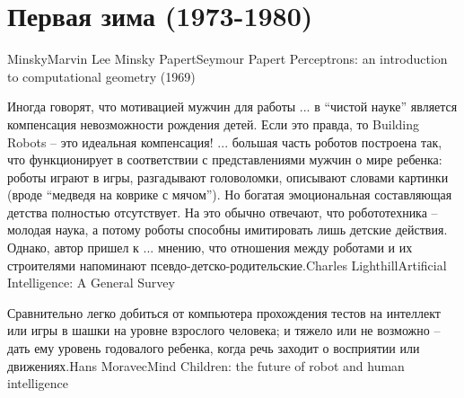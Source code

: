 \documentclass[24pt,pdf,hyperref={unicode}]{beamer}
\begin{document}
\section{Первая зима (1973-1980)}

\begin{frame}


\doublebio
{Minsky}{Marvin Lee Minsky}
{Papert}{Seymour Papert}
{Perceptrons: an introduction to computational geometry (1969)}

\end{frame}


\begin{frame}
\end{frame}

\begin{frame}
\citate
{\small
Иногда говорят, что мотивацией мужчин для работы ... в ``чистой науке'' является компенсация невозможности рождения детей. Если это правда, то Building Robots -- это идеальная компенсация! ... большая часть роботов построена так, что функционирует в соответствии с представлениями мужчин о мире ребенка: роботы играют в игры, разгадывают головоломки, описывают словами картинки (вроде ``медведя на коврике с мячом''). Но богатая эмоциональная составляющая детства полностью отсутствует. На это обычно отвечают, что робототехника -- молодая наука, а потому роботы способны имитировать лишь детские действия. Однако, автор пришел к ... мнению, что отношения между роботами и их строителями напоминают псевдо-детско-родительские.}{Charles Lighthill}{Artificial Intelligence: A General Survey}
\end{frame}

\begin{frame}
\end{frame}

\begin{frame}
\citate
{\small
Сравнительно легко добиться от компьютера прохождения тестов на интеллект или игры в шашки на уровне взрослого человека; и тяжело или не возможно -- дать ему уровень годовалого ребенка, когда речь заходит о восприятии или движениях.}{Hans Moravec}{Mind Children: the future of robot and human intelligence}
\end{frame}


\begin{frame}
\end{frame}
\end{document}
